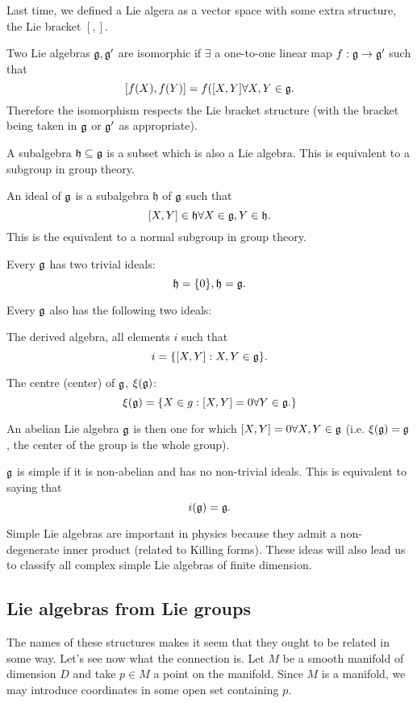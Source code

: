 Last time, we defined a Lie algera as a vector space with some extra structure, the Lie bracket $[,]$.
\begin{defn}
Two Lie algebras $\mathfrak{g},\mathfrak{g}'$ are isomorphic if $\exists$ a one-to-one linear map $f:\mathfrak{g}\to \mathfrak{g}'$ such that
$$[f(X),f(Y)]=f([X,Y]\forall X,Y\in \mathfrak{g}.$$
Therefore the isomorphism respects the Lie bracket structure (with the bracket being taken in $\mathfrak{g}$ or $\mathfrak{g}'$ as appropriate).
\end{defn}
\begin{defn}
A subalgebra $\mathfrak{h}\subseteq \mathfrak{g}$ is a subset which is also a Lie algebra. This is equivalent to a subgroup in group theory.
\end{defn}
\begin{defn}
An ideal of $\mathfrak{g}$ is a subalgebra $\mathfrak{h}$ of $\mathfrak{g}$ such that
$$[X,Y]\in \mathfrak{h}\forall X \in \mathfrak{g}, Y \in \mathfrak{h}.$$
This is the equivalent to a normal subgroup in group theory.
\end{defn}

\begin{exm}
Every $\mathfrak{g}$ has two trivial ideals:
$$\mathfrak{h}=\{0\}, \mathfrak{h}=\mathfrak{g}.$$
\end{exm}
Every $\mathfrak{g}$ also has the following two ideals:
\begin{exm}
The derived algebra, all elements $i$ such that
$$i=\{[X,Y]: X,Y\in \mathfrak{g}\}.$$
\end{exm}
\begin{exm}
The centre (center) of $\mathfrak{g}$, $\xi(\mathfrak{g})$:
$$\xi(\mathfrak{g})=\{X\in g: [X,Y]=0 \forall Y\in \mathfrak{g}.\}$$
\end{exm}

\begin{defn}
An abelian Lie algebra $\mathfrak{g}$ is then one for which $[X,Y]=0\forall X, Y \in \mathfrak{g}$ (i.e. $\xi(\mathfrak{g})=\mathfrak{g}$, the center of the group is the whole group).
\end{defn}
\begin{defn}
$\mathfrak{g}$ is simple if it is non-abelian and has no non-trivial ideals. This is equivalent to saying that
$$i(\mathfrak{g})=\mathfrak{g}.$$
\end{defn}
Simple Lie algebras are important in physics because they admit a non-degenerate inner product (related to Killing forms). These ideas will also lead us to classify all complex simple Lie algebras of finite dimension.

\subsection*{Lie algebras from Lie groups} The names of these structures makes it seem that they ought to be related in some way. Let's see now what the connection is. Let $M$ be a smooth manifold of dimension $D$ and take $p\in M$ a point on the manifold. Since $M$ is a manifold, we may introduce coordinates in some open set containing $p$. 

